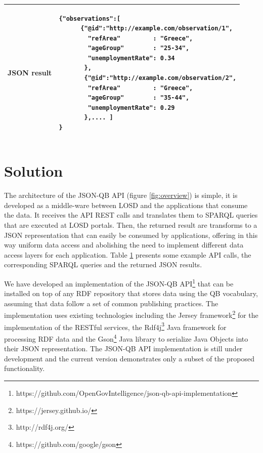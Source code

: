 \documentclass{llncs}
\begin{document}
\begin{table}
\begin{tabular}{|l|l|}
JSON result &
\begin{minipage}[t]{4.5in}
 \begin{verbatim} 
{"observations":[
      {"@id":"http://example.com/observation/1",
        "refArea"         : "Greece",
        "ageGroup"        : "25-34",
        "unemploymentRate": 0.34
       },
       {"@id":"http://example.com/observation/2",
        "refArea"         : "Greece",
        "ageGroup"        : "35-44",
        "unemploymentRate": 0.29
       },.... ]
}     
\end{verbatim}
\end{minipage}\\\hline


\end{tabular}
\label{tbl:apiexamplecall}
\end{table}


\section{Solution}\label{sec:solution}

The architecture of the JSON-QB API (figure \ref{fig:overview}) is simple, it is developed as a middle-ware between LOSD and the applications that consume the data. It receives the API REST calls and translates them to SPARQL queries that are executed at LOSD portals. Then, the returned result are transforms to a JSON representation that can easily be consumed by applications, offering in this way uniform data access and abolishing the need to implement different data access layers for each application. Table \ref{tbl:apiexamplecall} presents some example API calls, the corresponding SPARQL queries and the returned JSON results.


We have developed an implementation of the JSON-QB API\footnote{https://github.com/OpenGovIntelligence/json-qb-api-implementation} that can be installed on top of any RDF repository that stores data using the QB vocabulary, assuming that data follow a set of common publishing practices. The implementation uses existing technologies including the Jersey framework\footnote{https://jersey.github.io/} for the implementation of the RESTful services, the Rdf4j\footnote{http://rdf4j.org/} Java framework for processing RDF data and the Gson\footnote{https://github.com/google/gson} Java library to serialize Java Objects into their JSON representation. The JSON-QB API implementation is still under development and the current version demonstrates only a subset of the proposed functionality.
\end{document}
